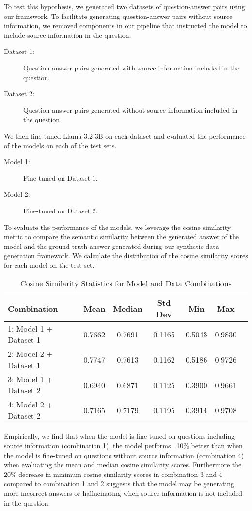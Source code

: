 To test this hypothesis, we generated two datasets of question-answer pairs using our framework.
To facilitate generating question-answer pairs without source information, we removed components in our pipeline
that instructed the model to include source information in the question.
\begin{description}
    \item[Dataset 1:] Question-answer pairs generated with source information included in the question.
    \item[Dataset 2:] Question-answer pairs generated without source information included in the question.
\end{description}

We then fine-tuned Llama 3.2 3B on each dataset and evaluated the performance of the models on each of the
test sets.
\begin{description}
    \item[Model 1:] Fine-tuned on Dataset 1.
    \item[Model 2:] Fine-tuned on Dataset 2.
\end{description}

To evaluate the performance of the models, we leverage the cosine similarity metric to compare the semantic similarity
between the generated answer of the model and the ground truth answer generated during our synthetic data generation framework.
We calculate the distribution of the cosine similarity scores for each model on the test set.

\begin{table}[h!]
\centering
\caption{Cosine Similarity Statistics for Model and Data Combinations}
\label{tab:cosine_similarity}
\begin{tabular}{lcccccc}
\hline
\textbf{Combination} & \textbf{Mean} & \textbf{Median} & \textbf{Std Dev} & \textbf{Min} & \textbf{Max} \\
\hline
1: Model 1 + Dataset 1 & 0.7662 & 0.7691 & 0.1165 & 0.5043 & 0.9830 \\
2: Model 2 + Dataset 1 & 0.7747 & 0.7613 & 0.1162 & 0.5186 & 0.9726 \\
3: Model 1 + Dataset 2 & 0.6940 & 0.6871 & 0.1125 & 0.3900 & 0.9661 \\
4: Model 2 + Dataset 2 & 0.7165 & 0.7179 & 0.1195 & 0.3914 & 0.9708 \\
\hline
\end{tabular}
\end{table}

Empirically, we find that when the model is fine-tuned on questions including source information (combination 1),
the model performs ~10\% better than when the model is fine-tuned on questions without source information (combination 4)
when evaluating the mean and median cosine similarity scores. Furthermore the 20\% decrease in minimum cosine
similarity scores in combination 3 and 4 compared to combination 1 and 2 suggests that the model may be generating
more incorrect answers or hallucinating when source information is not included in the question.

